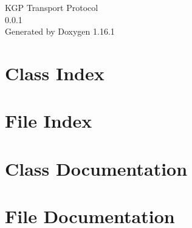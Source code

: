 \documentclass[twoside]{book}
\newcommand{\+}{\discretionary{\mbox{\scriptsize$\hookleftarrow$}}{}{}}
\newcommand{\clearemptydoublepage}{%
    \newpage{\pagestyle{empty}\cleardoublepage}%
  }
\begin{document}
  \raggedbottom
    \hypersetup{pageanchor=false,
                bookmarksnumbered=true,
                pdfencoding=unicode
               }
  \begin{titlepage}
  \vspace*{7cm}
  \begin{center}%
  {\Large KGP Transport Protocol}\\
  [1ex]\large 0.\+0.\+1 \\
  \vspace*{1cm}
  {\large Generated by Doxygen 1.16.1}\\
  \end{center}
  \end{titlepage}
  \clearemptydoublepage
  \tableofcontents
  \clearemptydoublepage
  \hypersetup{pageanchor=true}
\chapter{Class Index}

\chapter{File Index}

\chapter{Class Documentation}





\chapter{File Documentation}








  \backmatter
  \newpage
  \clearemptydoublepage
  \printindex
\end{document}

